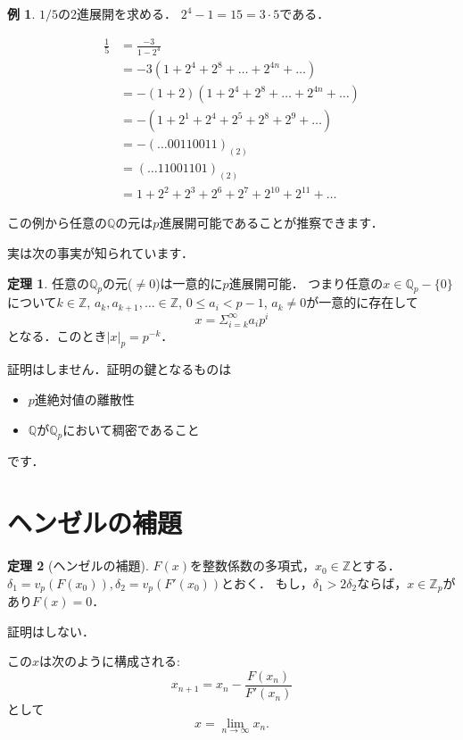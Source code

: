 \documentclass[uplatex]{jsarticle}
\newcommand{\Z}{\mathbb{Z}}
\newcommand{\Q}{\mathbb{Q}}
\theoremstyle{definition} %
\newtheorem{thm}{定理}
\newtheorem*{example*}{例}
\begin{document}
\begin{example*}
$1/5$の$2$進展開を求める．
$2^4-1 = 15 = 3 \cdot 5$である．

\begin{align*}
\frac{1}{5} &= \frac{-3}{1-2^4} \\
&= -3 (1 + 2^4 + 2^8 + \dots+ 2^{4n} + \dots) \\
&= -(1+2) (1 + 2^4 + 2^8 + \dots+ 2^{4n} + \dots) \\
&= -(1 + 2^1 + 2^4 + 2^5 + 2^8 + 2^9 + \dots) \\
&= -(\dots 00110011)_{(2)} \\
&= (\dots 11001101)_{(2)} \\
&= 1 + 2^2 + 2^3 + 2^6 + 2^7 + 2^{10} + 2^{11} + \dots
\end{align*}
\end{example*}

この例から任意の$\Q$の元は$p$進展開可能であることが推察できます．

実は次の事実が知られています．
\begin{oframed}\begin{thm}
任意の$\Q_p$の元($\ne 0$)は一意的に$p$進展開可能．
つまり任意の$x \in \Q_p- \{0\}$について$k \in \Z$, $a_k, a_{k+1}, \dots \in \Z$, $0 \le a_i < p-1$, $a_k \ne 0$が一意的に存在して
\[x = \Sigma_{i=k}^\infty a_i p^i\]
となる．このとき$|x|_p = p^{-k}$．
\end{thm}\end{oframed}
証明はしません．証明の鍵となるものは
\begin{itemize}
\item $p$進絶対値の離散性
\item $\Q$が$\Q_p$において稠密であること
\end{itemize}
です．

\section{ヘンゼルの補題}

\begin{oframed}\begin{thm}[ヘンゼルの補題]
$F(x)$を整数係数の多項式，$x_0 \in \Z$とする．
$\delta_1 = v_p(F(x_0)), \delta_2 = v_p(F'(x_0))$とおく．
もし，$\delta_1 > 2 \delta_2$ならば，$x \in \Z_p$があり$F(x)=0$．
\end{thm}\end{oframed}
証明はしない．

この$x$は次のように構成される:
\[x_{n+1} = x_n - \frac{F(x_n)}{F'(x_n)}\]
として
\[x = \lim_{n\to\infty}x_n.\]
\end{document}
